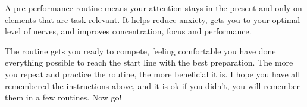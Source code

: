 \documentclass[12pt]{article}
\begin{document}
A pre-performance routine means your attention stays in the present and only on elements that are task-relevant. It helps reduce anxiety, gets you to your optimal level
of nerves, and improves concentration, focus and performance.

The routine gets you ready to compete, feeling comfortable you have done everything possible to reach the start line with the best preparation. The more you repeat and
practice the routine, the more beneficial it is. I hope you have all remembered the instructions above, and it is ok if you didn't, you will remember them in a few routines.
Now go!




\end{document}
